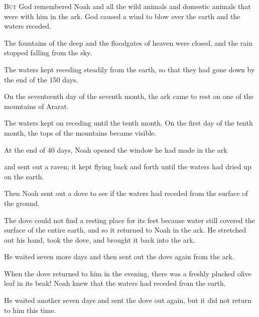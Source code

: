 \begin{scripture}
 \allowchapbreak\hypertarget{ch-genesis-8}{}\lettrine[lines=5]{\color{pentateuch}B}{\textsc{ut}} God remembered Noah and all the wild animals and domestic animals that were with him in the ark. God caused a wind to blow over the earth and the waters receded.\everypar{}
 The fountains of the deep and the floodgates of heaven were closed, and the rain stopped falling from the sky.
 The waters kept receding steadily from the earth, so that they had gone down by the end of the 150 days.
 On the seventeenth day of the seventh month, the ark came to rest on one of the mountains of Ararat.
 The waters kept on receding until the tenth month. On the first day of the tenth month, the tops of the mountains became visible.
\everypar{}

 At the end of 40 days, Noah opened the window he had made in the ark
 and sent out a raven; it kept flying back and forth until the waters had dried up on the earth.
\everypar{}

 Then Noah sent out a dove to see if the waters had receded from the surface of the ground.
 The dove could not find a resting place for its feet because water still covered the surface of the entire earth, and so it returned to Noah in the ark. He stretched out his hand, took the dove, and brought it back into the ark.
 He waited seven more days and then sent out the dove again from the ark.
 When the dove returned to him in the evening, there was a freshly plucked olive leaf in its beak! Noah knew that the waters had receded from the earth.
 He waited another seven days and sent the dove out again, but it did not return to him this time.
\everypar{}


\end{scripture}
